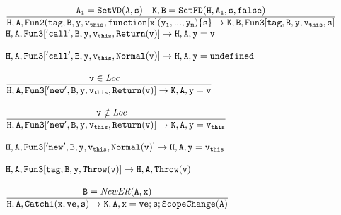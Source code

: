 \documentclass[a4paper, leqno]{amsart}
\newcommand{\loc}{\emph{Loc}}
\begin{document}
\[\begin{array}{l@{}l@{}ll}
 & \ \ & \frac{
    \begin{matrix}
       {\tt A_1 = SetVD(A,s)} & {\tt K,B = SetFD(H,A_1,s,false)}
    \end{matrix}}{
    \begin{matrix}
       {\tt H,A,Fun2(tag,B,y,v_{this},function[x](y_1,...,y_m)\{s\}\rightarrow K,B,Fun3[tag,B,y,v_{this},s]}
    \end{matrix}} & \\ 
    
 & \ \ & {\tt H,A,Fun3['call',B,y,v_{this},Return(v)] \rightarrow H,A,y=v }& \\ 
 & & \\
 
 & \ \ & {\tt H,A,Fun3['call',B,y,v_{this},Normal(v)] \rightarrow H,A,y=undefined }& \\ 
 & & \\
 
 & \ \ & \frac{
    \begin{matrix}
       {\tt v \in \loc} &
    \end{matrix}}{
    \begin{matrix}
       {\tt H,A,Fun3['new',B,y,v_{this},Return(v)] \rightarrow K,A,y=v}
    \end{matrix}} & \\  
 & & \\
 
 & \ \ & \frac{
    \begin{matrix}
       {\tt v \notin \loc} &
    \end{matrix}}{
    \begin{matrix}
       {\tt H,A,Fun3['new',B,y,v_{this},Return(v)] \rightarrow K,A,y=v_{this}}
    \end{matrix}} & \\  
 & & \\
 
 & \ \ & {\tt H,A,Fun3['new',B,y,v_{this},Normal(v)] \rightarrow H,A,y=v_{this} }& \\ 
 & & \\
 
 & \ \ & {\tt H,A,Fun3[tag,B,y,Throw(v)] \rightarrow H,A,Throw(v) }& \\    
 & & \\
 
 
 & \ \ & \frac{
    \begin{matrix}
       {\tt B = \emph{NewER}(A,x)}
    \end{matrix}}{
    \begin{matrix}
       {\tt H,A,Catch1(x,ve,s) \rightarrow K,A,x=ve;s;ScopeChange(A)}
    \end{matrix}} & \\  
 & & \\
 

\end{array}\]
\end{document}
